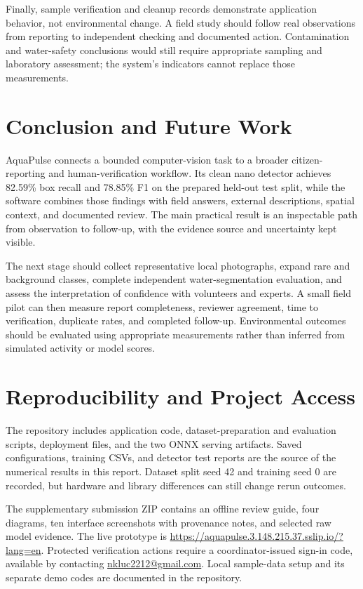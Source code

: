 \documentclass[a4paper,11pt]{article}
\begin{document}
Finally, sample verification and cleanup records demonstrate application behavior, not environmental change. A field study should follow real observations from reporting to independent checking and documented action. Contamination and water-safety conclusions would still require appropriate sampling and laboratory assessment; the system's indicators cannot replace those measurements.

\section{Conclusion and Future Work}

AquaPulse connects a bounded computer-vision task to a broader citizen-reporting and human-verification workflow. Its clean nano detector achieves 82.59\% box recall and 78.85\% F1 on the prepared held-out test split, while the software combines those findings with field answers, external descriptions, spatial context, and documented review. The main practical result is an inspectable path from observation to follow-up, with the evidence source and uncertainty kept visible.

The next stage should collect representative local photographs, expand rare and background classes, complete independent water-segmentation evaluation, and assess the interpretation of confidence with volunteers and experts. A small field pilot can then measure report completeness, reviewer agreement, time to verification, duplicate rates, and completed follow-up. Environmental outcomes should be evaluated using appropriate measurements rather than inferred from simulated activity or model scores.

\section{Reproducibility and Project Access}

The repository \cite{ref1} includes application code, dataset-preparation and evaluation scripts, deployment files, and the two ONNX serving artifacts. Saved configurations, training CSVs, and detector test reports are the source of the numerical results in this report. Dataset split seed 42 and training seed 0 are recorded, but hardware and library differences can still change rerun outcomes.

The supplementary submission ZIP contains an offline review guide, four diagrams, ten interface screenshots with provenance notes, and selected raw model evidence. The live prototype is \url{https://aquapulse.3.148.215.37.sslip.io/?lang=en}. Protected verification actions require a coordinator-issued sign-in code, available by contacting \href{mailto:nkluc2212@gmail.com}{nkluc2212@gmail.com}. Local sample-data setup and its separate demo codes are documented in the repository.
\end{document}
